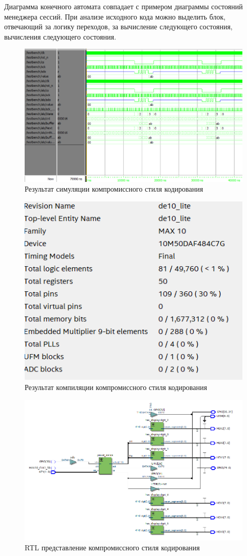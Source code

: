 \documentclass[a4paper,14pt]{article}
\begin{document}
	Диаграмма конечного автомата совпадает с примером диаграммы состояний менеджера сессий.
	При анализе исходного кода можно выделить блок, отвечающий за логику переходов, за вычисление следующего состояния, вычисления следующего состояния.
	
	\begin{figure}[H]
		\centering
		\includegraphics[width=0.9\linewidth]{images/9_3_wave}
		\caption{Результат симуляции компромиссного стиля кодирования}
		\label{fig:9_3_wave}
	\end{figure}
	
	\begin{figure}[H]
		\centering
		\includegraphics[width=0.5\linewidth]{images/9_3_compilation}
		\caption{Результат компиляции компромиссного стиля кодирования}
		\label{fig:9_3_compilation}
	\end{figure}
	
	\begin{figure}[H]
		\centering
		\includegraphics[width=0.9\linewidth]{images/9_3_rtl}
		\caption{RTL представление компромиссного стиля кодирования}
		\label{fig:9_3_rtl}
	\end{figure}
	
\end{document}
